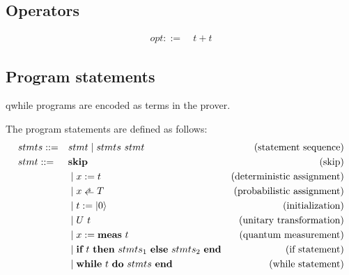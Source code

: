 \subsection{Operators}

\begin{definition}
    \begin{align*}
        opt ::= & \ t + t
    \end{align*}
\end{definition}

\subsection{Program statements}
qwhile programs are encoded as terms in the prover.

\newcommand{\rndarrow}{%
  \stackrel{\raisebox{-.25ex}[.25ex]%
   {\tiny $\mathdollar$}}{\raisebox{-.25ex}[.25ex]{$\leftarrow$}}}

\newcommand{\Skip}{\textbf{skip}}
\newcommand{\Assign}[2]{\ensuremath{#1:=#2}}
\newcommand{\pAssign}[2]{\ensuremath{#1 \rndarrow #2}}
\newcommand{\Init}[1]{\ensuremath{#1:=\ket{0}}}
\newcommand{\MeaAssign}[2]{\ensuremath{#1 := \textbf{meas}\ #2}}
\newcommand{\If}[3]{\ensuremath{
    \textbf{if}\ #1\ \textbf{then}\ #2\ \textbf{else}\ #3\ \textbf{end}
}}
\newcommand{\While}[2]{\ensuremath{
    \textbf{while}\ #1\ \textbf{do}\ #2\ \textbf{end}
}}

\begin{definition}
    \label{def: prog syntax}
    The program statements are defined as follows:
    \begin{align*}
        & stmts ::= && stmt \mid stmts\ stmt & \text{(statement sequence)} \\
        & stmt ::= && \Skip & \text{(skip)} \\
            & && \mid \Assign{x}{t} & \text{(deterministic assignment)} \\
            & && \mid \pAssign{x}{T} & \text{(probabilistic assignment)} \\
            & && \mid \Init{t} & \text{(initialization)} \\
            & && \mid U\ t & \text{(unitary transformation)} \\
            & && \mid \MeaAssign{x}{t} & \text{(quantum measurement)} \\
            & && \mid \If{t}{stmts_1}{stmts_2} & \text{(if statement)} \\
            & && \mid \While{t}{stmts} & \text{(while statement)}
    \end{align*}
\end{definition}

